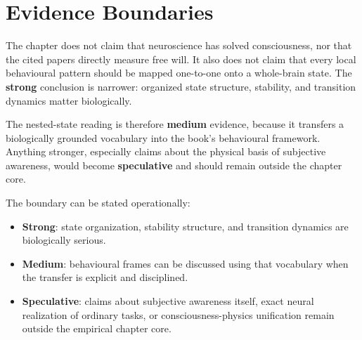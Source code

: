 \section{Evidence Boundaries}

The chapter does not claim that neuroscience has solved consciousness, nor
that the cited papers directly measure free will. It also does not claim that
every local behavioural pattern should be mapped one-to-one onto a whole-brain
state. The \textbf{strong} conclusion is narrower: organized state structure,
stability, and transition dynamics matter biologically.

The nested-state reading is therefore \textbf{medium} evidence, because it
transfers a biologically grounded vocabulary into the book's behavioural
framework. Anything stronger, especially claims about the physical basis of
subjective awareness, would become \textbf{speculative} and should remain
outside the chapter core.

\begin{discussion}
The boundary can be stated operationally:
\begin{itemize}[nosep]
  \item \textbf{Strong}: state organization, stability structure, and
        transition dynamics are biologically serious.
  \item \textbf{Medium}: behavioural frames can be discussed using that
        vocabulary when the transfer is explicit and disciplined.
  \item \textbf{Speculative}: claims about subjective awareness itself, exact
        neural realization of ordinary tasks, or consciousness-physics
        unification remain outside the empirical chapter core.
\end{itemize}
\end{discussion}
